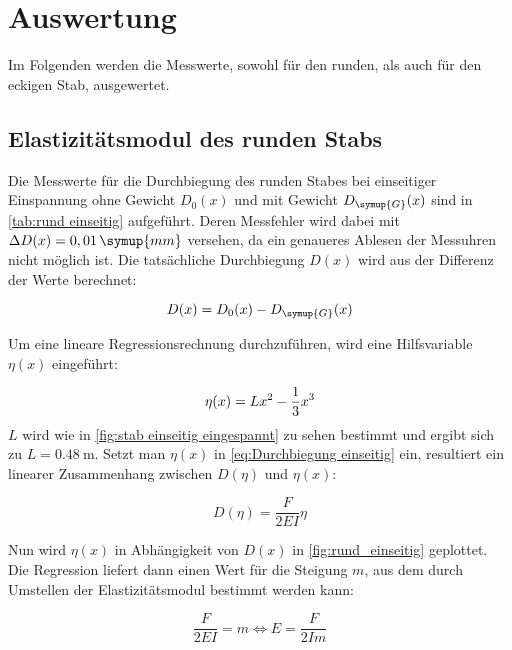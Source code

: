 \section{Auswertung}
\label{sec:Auswertung}
Im Folgenden werden die Messwerte, sowohl für den runden, als auch für den eckigen Stab, ausgewertet.
\subsection{Elastizitätsmodul des runden Stabs}  %
\label{sec:Elastizitätsmodul rund}

Die Messwerte für die Durchbiegung des runden Stabes bei einseitiger Einspannung ohne Gewicht $D_{0}(x)$
und mit Gewicht $D_{\symup{G}}(x)$ sind in \autoref{tab:rund einseitig} aufgeführt.
Deren Messfehler wird dabei mit $\Delta D(x) =  0,01\,\symup{mm}$ versehen, da ein genaueres Ablesen der Messuhren nicht möglich ist. 
Die tatsächliche Durchbiegung $D(x)$ wird aus der Differenz der Werte berechnet:

\begin{equation}
  D(x)= D_{0}(x)-D_{\symup{G}}(x) \notag
  \label{eq:Delta D}
\end{equation}


Um eine lineare Regressionsrechnung durchzuführen, wird eine Hilfsvariable $\eta(x)$ eingeführt:

\begin{equation}
  \eta(x)=Lx^{2}-\frac{1}{3}x^{3} \notag
  \label{eq:eta einseitig rund}
\end{equation}
$L$ wird wie in \autoref{fig:stab einseitig eingespannt} zu sehen bestimmt und ergibt sich zu $L=\qty{0,48}{\metre}$.
Setzt man $\eta(x)$ in \autoref{eq:Durchbiegung einseitig} ein, resultiert ein linearer Zusammenhang zwischen $D(\eta)$ und $\eta(x)$:

\begin{equation}
  D(\eta)=\frac{F}{2EI}\eta
  \label{eq:Geradengleichung}
\end{equation}

Nun wird $\eta(x)$ in Abhängigkeit von $D(x)$ in \autoref{fig:rund_einseitig} geplottet.
Die Regression liefert dann einen Wert für die Steigung $m$, aus dem durch Umstellen der Elastizitätsmodul bestimmt werden kann:

\begin{equation}
  \frac{F}{2EI}=m \Leftrightarrow E=\frac{F}{2Im}
  \label{eq:Elastizitätsmodul aus Steigung}
\end{equation}

